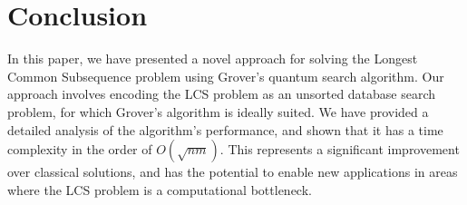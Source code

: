 \section{Conclusion}
\label{sec:conclusion}

In this paper, we have presented a novel approach for solving the Longest Common Subsequence problem using Grover's quantum search algorithm. Our approach involves encoding the LCS problem as an unsorted database search problem, for which Grover's algorithm is ideally suited. We have provided a detailed analysis of the algorithm's performance, and shown that it has a time complexity in the order of $O(\sqrt{nm})$. This represents a significant improvement over classical solutions, and has the potential to enable new applications in areas where the LCS problem is a computational bottleneck.

